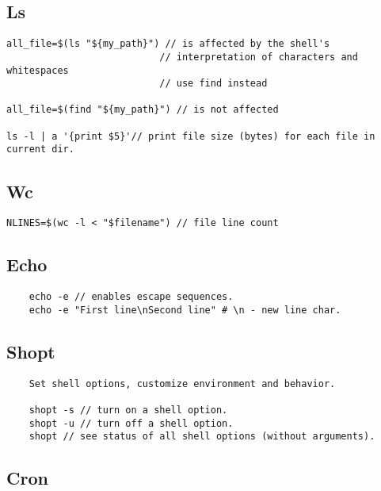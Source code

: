 \subsection{Ls}

\begin{verbatim}
all_file=$(ls "${my_path}") // is affected by the shell's
                           // interpretation of characters and whitespaces
                           // use find instead 

all_file=$(find "${my_path}") // is not affected

ls -l | a '{print $5}'// print file size (bytes) for each file in current dir.
\end{verbatim}

\subsection{Wc}

\begin{verbatim}
NLINES=$(wc -l < "$filename") // file line count
\end{verbatim}

\subsection{Echo}

\begin{verbatim}
    echo -e // enables escape sequences.
    echo -e "First line\nSecond line" # \n - new line char.
\end{verbatim}

\subsection{Shopt}

\begin{verbatim}
    Set shell options, customize environment and behavior.

    shopt -s // turn on a shell option.
    shopt -u // turn off a shell option.
    shopt // see status of all shell options (without arguments).
\end{verbatim}

\subsection{Cron}

